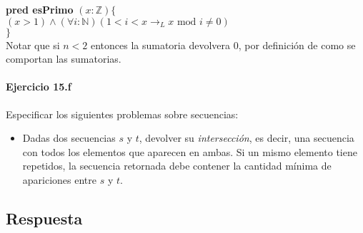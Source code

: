 \documentclass[a4paper]{article}
\begin{document}
			
			
			
			
			\textbf{pred esPrimo} $(x: \mathbb{Z})\{$\\ 
			\hspace*{6mm}$ (x > 1)\wedge(\forall i :\mathbb{N})
			(1<i<x \rightarrow _L x\textrm{ mod }i\neq 0 )$\\
			\hspace*{5mm}$\}$\smallskip \\
			
Notar que si $n<2$ entonces la sumatoria devolvera 0, por definición de como se comportan las 
sumatorias.
			
\paragraph*{Ejercicio 15.f} Especificar los siguientes problemas sobre secuencias:
	\begin{itemize}
		\item Dadas dos secuencias $s$ y $t$, devolver su \textit{intersección}, es
				decir, una secuencia con todos los elementos que aparecen en ambas. Si un mismo
				elemento tiene repetidos, la secuencia retornada debe contener la cantidad
				mínima de apariciones entre $s$ y $t$.
	\end{itemize}

\subsection*{Respuesta}
\end{document}
